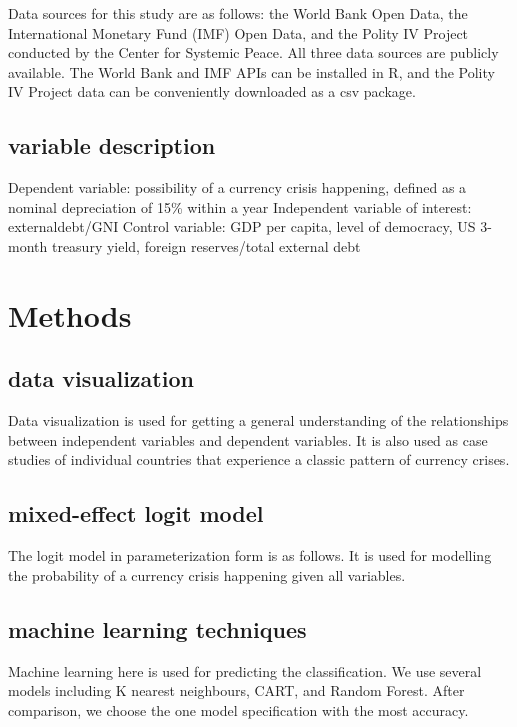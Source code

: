 \documentclass[12pt,]{article}
\begin{document}
Data sources for this study are as follows: the World Bank Open Data,
the International Monetary Fund (IMF) Open Data, and the Polity IV
Project conducted by the Center for Systemic Peace. All three data
sources are publicly available. The World Bank and IMF APIs can be
installed in R, and the Polity IV Project data can be conveniently
downloaded as a csv package.

\subsection{variable description}\label{variable-description}

Dependent variable: possibility of a currency crisis happening, defined
as a nominal depreciation of 15\% within a year Independent variable of
interest: externaldebt/GNI Control variable: GDP per capita, level of
democracy, US 3-month treasury yield, foreign reserves/total external
debt

\section{Methods}\label{methods}

\subsection{data visualization}\label{data-visualization}

Data visualization is used for getting a general understanding of the
relationships between independent variables and dependent variables. It
is also used as case studies of individual countries that experience a
classic pattern of currency crises.

\subsection{mixed-effect logit model}\label{mixed-effect-logit-model}

The logit model in parameterization form is as follows. It is used for
modelling the probability of a currency crisis happening given all
variables.

\subsection{machine learning
techniques}\label{machine-learning-techniques}

Machine learning here is used for predicting the classification. We use
several models including K nearest neighbours, CART, and Random Forest.
After comparison, we choose the one model specification with the most
accuracy.
\end{document}
